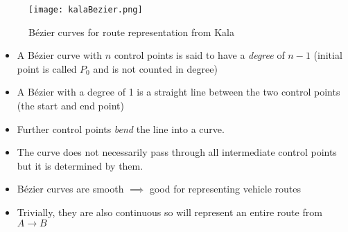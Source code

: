 \documentclass{beamer}
\begin{document}
\begin{frame}


    \begin{figure}[KalaBezier]
        \centering
        \texttt{[image: kalaBezier.png]}
        \caption{Bézier curves for route representation from Kala \cite{kalaOnroadIntelligentVehicles2016}}%
        \label{fig:.ext}
    \end{figure}

    \begin{itemize}
        \item A Bézier curve with $n$ control points is said to have a \textit{degree} of $n-1$ (initial point is called $P_0$ and is not counted in degree)
        \item A Bézier with a degree of 1 is a straight line between the two control points (the start and end point)
        \item Further control points \textit{bend} the line into a curve.
        \item The curve does not necessarily pass through all intermediate control points but it is determined by them.
        \item Bézier curves are smooth $\implies$ good for representing vehicle routes
        \item Trivially, they are also continuous so will represent an entire route from $A \rightarrow B$ 
    \end{itemize}
\end{frame}
\end{document}
